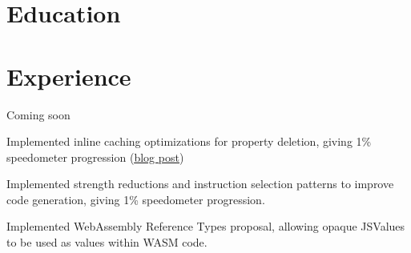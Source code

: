 \documentclass[12pt]{jmichaud-resume}
\begin{document}
\begin{minipage}[t]{5.4cm}
\vspace{65pt}

\section{Education} 




\end{minipage}
\hfill
\begin{minipage}[t]{11.5cm}
\section{Experience}

 \hfill {}
\vspace{10pt}
\begin{tightemize}
	\item Coming soon
\end{tightemize}
\sectionsep

\hfill {}

\begin{tightemize}
	\item Implemented inline caching optimizations for property deletion, giving 1\% speedometer progression (\href{https://webkit.org/blog/10298/inline-caching-delete/}{\underline{blog post}})
	
\end{tightemize}
\sectionsepp
\hfill {}
\begin{tightemize}
	\item Implemented strength reductions and instruction selection patterns to improve code generation, giving 1\% speedometer progression.
	\item Implemented WebAssembly Reference Types proposal, allowing opaque JSValues to be used as values within WASM code.
	
\end{tightemize}
\sectionsep
{} \hfill {}


\end{minipage}
\end{document}

